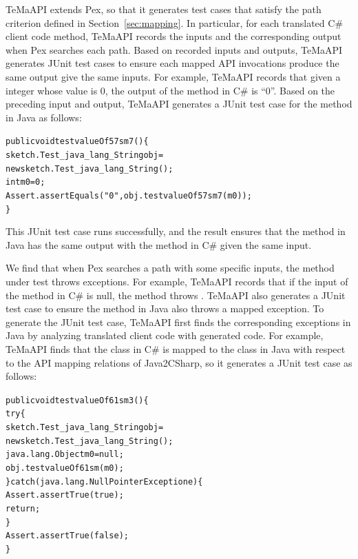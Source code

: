 TeMaAPI extends Pex, so that it generates test cases that satisfy the path criterion defined in Section~\ref{sec:mapping}. In particular, for each translated C\# client code method, TeMaAPI records the inputs and the corresponding output when Pex searches each path. Based on recorded inputs and outputs, TeMaAPI generates JUnit test cases to ensure each mapped API invocations produce the same output give the same inputs.
For example, TeMaAPI records that given a integer whose value is 0, the output of the  method in C\# is ``0''. Based on the preceding input and output, TeMaAPI generates a JUnit test case for the  method in Java as follows:

\begin{CodeOut}%
\begin{alltt}
public void testvalueOf57sm7()\{
  sketch.Test_java_lang_String obj =
      new sketch.Test_java_lang_String();
  int m0 = 0;
  Assert.assertEquals("0", obj.testvalueOf57sm7(m0));
\}
\end{alltt}
\end{CodeOut}

This JUnit test case runs successfully, and the result ensures that the  method in Java has the same output with the  method in C\# given the same input.


We find that when Pex searches a path with some specific inputs, the method under test throws exceptions.
For example, TeMaAPI records that if the input of the  method in C\# is null, the method throws . TeMaAPI also generates a JUnit test case to ensure the  method in Java also throws a mapped exception. To generate the JUnit test case, TeMaAPI first finds the corresponding exceptions in Java by analyzing translated client code with generated code. For example, TeMaAPI finds that the  class in C\# is mapped to the  class in Java with respect to the API mapping relations of Java2CSharp, so it generates a JUnit test case as follows:

\begin{CodeOut}%
\begin{alltt}
 public void testvalueOf61sm3()\{
   try\{
     sketch.Test_java_lang_String obj =
           new sketch.Test_java_lang_String();
     java.lang.Object m0 = null;
     obj.testvalueOf61sm(m0);
   \}catch(java.lang.NullPointerException e)\{
     Assert.assertTrue(true);
     return;
   \}
   Assert.assertTrue(false);
 \}
\end{alltt}
\end{CodeOut}

